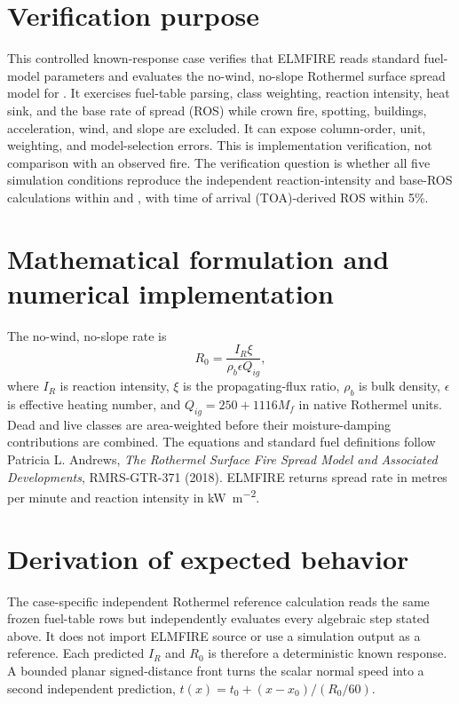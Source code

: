 \section{Verification purpose}

This controlled known-response case verifies that ELMFIRE reads standard fuel-model parameters and evaluates the no-wind, no-slope Rothermel surface spread model for \FuelSet.  It exercises fuel-table parsing, class weighting, reaction intensity, heat sink, and the base rate of spread (ROS) while crown fire, spotting, buildings, acceleration, wind, and slope are excluded.  It can expose column-order, unit, weighting, and model-selection errors.  This is implementation verification, not comparison with an observed fire.  The verification question is whether all five simulation conditions reproduce the independent reaction-intensity and base-ROS calculations within \IrTolerance{} and \RosTolerance{}, with time of arrival (TOA)-derived ROS within 5\%.

\section{Mathematical formulation and numerical implementation}
The no-wind, no-slope rate is
\begin{equation}R_0=\frac{I_R\xi}{\rho_b\epsilon Q_{ig}},\end{equation}
where $I_R$ is reaction intensity, $\xi$ is the propagating-flux ratio, $\rho_b$ is bulk density, $\epsilon$ is effective heating number, and $Q_{ig}=250+1116M_f$ in native Rothermel units.  Dead and live classes are area-weighted before their moisture-damping contributions are combined.  The equations and standard fuel definitions follow Patricia L. Andrews, \emph{The Rothermel Surface Fire Spread Model and Associated Developments}, RMRS-GTR-371 (2018).  ELMFIRE returns spread rate in metres per minute and reaction intensity in \si{kW.m^{-2}}.

\section{Derivation of expected behavior}
The case-specific independent Rothermel reference calculation reads the same frozen fuel-table rows but independently evaluates every algebraic step stated above.  It does not import ELMFIRE source or use a simulation output as a reference.  Each predicted $I_R$ and $R_0$ is therefore a deterministic known response.  A bounded planar signed-distance front turns the scalar normal speed into a second independent prediction, $t(x)=t_0+(x-x_0)/(R_0/60)$.

